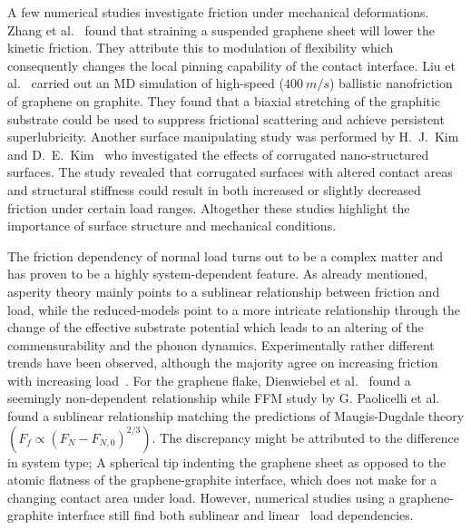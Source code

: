 


A few numerical studies investigate friction under mechanical deformations. 
Zhang et al.~\cite{zhang_tuning_2019} found that straining a suspended graphene sheet will lower the kinetic friction. They attribute this to modulation of flexibility which consequently changes the local pinning capability of the contact interface. Liu et al.~\cite{liu_high-speed_2014} carried out an \acrshort{MD} simulation of high-speed ($\SI{400}{m/s}$) ballistic nanofriction of graphene on graphite. They found that a biaxial stretching of the graphitic substrate could be used to suppress frictional scattering and achieve persistent superlubricity. Another surface manipulating study was performed by H.\ J.\ Kim and D.\ E.\ Kim~\cite{Kim_2012} who investigated the effects of corrugated
nano-structured surfaces. The study revealed that corrugated surfaces with altered contact areas and structural stiffness could result in both increased or slightly decreased friction under certain load ranges. Altogether these studies highlight the importance of surface structure and mechanical conditions. 


The friction dependency of normal load turns out to be a complex matter and has
proven to be a highly system-dependent feature. As already mentioned, asperity
theory mainly points to a sublinear relationship between friction and load,
while the reduced-models point to a more intricate relationship through
the change of the effective substrate potential which leads to an altering of
the commensurability and the phonon dynamics. Experimentally rather different trends have been observed, although the majority agree on increasing friction with
increasing load~\cite[p. 200]{gnecco_meyer_2015}. For the graphene flake,
Dienwiebel et al.~\cite{DIENWIEBEL2005197} found a seemingly non-dependent
relationship while \acrshort{FFM} study by G. Paolicelli et al.\
\cite{Paolicelli_2015} found a sublinear relationship matching the predictions of
Maugis-Dugdale theory $(F_f \propto (F_N - F_{N,0})^{2/3})$. The discrepancy
might be attributed to the difference in system type; A spherical tip indenting the graphene sheet as opposed to the atomic flatness of the graphene-graphite
interface, which does not make for a changing contact area under load. However,
numerical studies using a graphene-graphite interface still find both sublinear
\cite{bonelli_atomistic_2009} and linear~\cite{ma12091425, zhang_tuning_2019}
load dependencies. 

